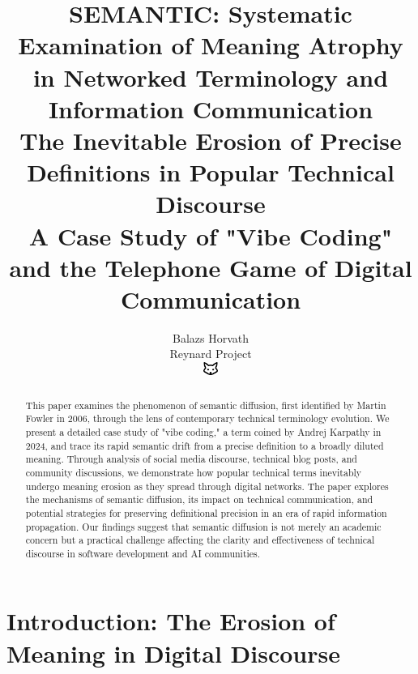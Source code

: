 \documentclass[11pt]{article}
\begin{document}
\title{\textbf{SEMANTIC: Systematic Examination of Meaning Atrophy in Networked Terminology and Information Communication} \\
\Large{The Inevitable Erosion of Precise Definitions in Popular Technical Discourse} \\
\large{A Case Study of "Vibe Coding" and the Telephone Game of Digital Communication}}

\author{Balazs Horvath\\
Reynard Project\\
\includegraphics[width=0.5cm]{../../shared-assets/favicon.pdf}}

\maketitle

\begin{abstract}
This paper examines the phenomenon of semantic diffusion, first identified by Martin Fowler in 2006, through the lens of contemporary technical terminology evolution. We present a detailed case study of "vibe coding," a term coined by Andrej Karpathy in 2024, and trace its rapid semantic drift from a precise definition to a broadly diluted meaning. Through analysis of social media discourse, technical blog posts, and community discussions, we demonstrate how popular technical terms inevitably undergo meaning erosion as they spread through digital networks. The paper explores the mechanisms of semantic diffusion, its impact on technical communication, and potential strategies for preserving definitional precision in an era of rapid information propagation. Our findings suggest that semantic diffusion is not merely an academic concern but a practical challenge affecting the clarity and effectiveness of technical discourse in software development and AI communities.
\end{abstract}

\tableofcontents
\newpage

\section{Introduction: The Erosion of Meaning in Digital Discourse}
\end{document}
